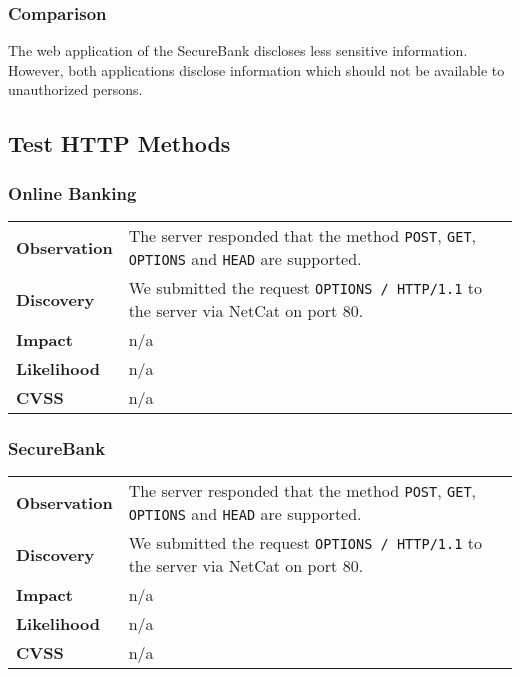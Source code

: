 \subsubsection*{Comparison}
The web application of the SecureBank discloses less sensitive information. However, both applications disclose information which should not be available to unauthorized persons.

\clearpage

\subsection{Test HTTP Methods}

\subsubsection*{Online Banking}

\begin{tabular}{l|p{10cm}}

\textbf{Observation} & The server responded that the method \texttt{POST}, \texttt{GET}, \texttt{OPTIONS} and \texttt{HEAD} are supported.  \\
\textbf{Discovery} & We submitted the request \texttt{OPTIONS / HTTP/1.1} to the server via NetCat on port 80. \\
\textbf{Impact} & n/a \\
\textbf{Likelihood} & n/a \\
\textbf{CVSS} & n/a \\
\end{tabular}


\subsubsection*{SecureBank}

\begin{tabular}{l|p{10cm}}

\textbf{Observation} & The server responded that the method \texttt{POST}, \texttt{GET}, \texttt{OPTIONS} and \texttt{HEAD} are supported.  \\
\textbf{Discovery} & We submitted the request \texttt{OPTIONS / HTTP/1.1} to the server via NetCat on port 80. \\
\textbf{Impact} & n/a \\
\textbf{Likelihood} & n/a \\
\textbf{CVSS} & n/a \\
\end{tabular}

